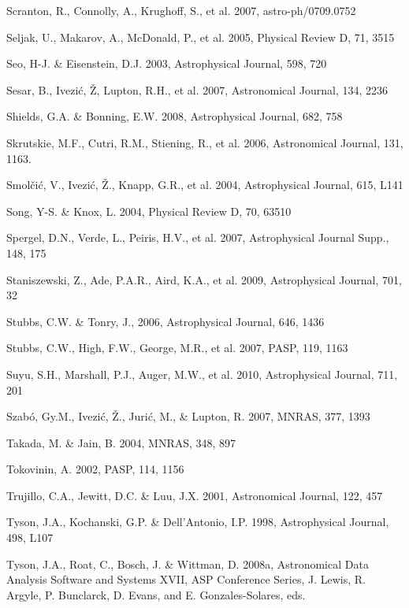 \documentclass{emulateapj}
\begin{document}
\begin{thebibliography}{}
\bibitem[()]{} Scranton, R., Connolly, A., Krughoff, S., et al. 2007, astro-ph/0709.0752

\bibitem[()]{} Seljak, U., Makarov, A., McDonald, P., et al. 2005,  Physical Review D, 71, 3515

\bibitem[()]{} Seo, H-J. \& Eisenstein, D.J. 2003, Astrophysical Journal, 598, 720

\bibitem[()]{} Sesar, B., Ivezi\'{c}, \v{Z}, Lupton, R.H., et al. 2007, Astronomical Journal, 134, 2236

\bibitem[()]{} Shields, G.A. \& Bonning, E.W. 2008,  Astrophysical Journal, 682, 758 

\bibitem[()]{} Skrutskie, M.F., Cutri, R.M., Stiening, R., et al. 2006, Astronomical Journal, 131, 1163.

\bibitem[()]{} Smol{\v c}i{\'c}, V., Ivezi\'{c}, \v{Z.}, Knapp, G.R., et al. 2004, Astrophysical 
             Journal, 615, L141 

\bibitem[()]{} Song, Y-S. \& Knox, L. 2004, Physical Review D, 70, 63510

\bibitem[()]{} Spergel, D.N., Verde, L., Peiris, H.V., et al. 2007, Astrophysical Journal Supp., 148, 175

\bibitem[()]{} Staniszewski, Z., Ade, P.A.R., Aird, K.A., et al. 2009,  Astrophysical  Journal, 701, 32

\bibitem[()]{} Stubbs, C.W. \& Tonry, J., 2006, Astrophysical Journal, 646, 1436

\bibitem[()]{} Stubbs, C.W., High, F.W., George, M.R., et al. 2007, PASP, 119, 1163 

\bibitem[()]{} Suyu, S.H., Marshall, P.J., Auger, M.W., et al. 2010, Astrophysical Journal, 711, 201

\bibitem[()]{} Szab\'o, Gy.M., Ivezi\'c, \v{Z}., Juri\'c, M., \& Lupton, R. 2007, MNRAS, 377, 1393

\bibitem[()]{} Takada, M. \& Jain, B. 2004, MNRAS, 348, 897

\bibitem[()]{} Tokovinin, A. 2002, PASP, 114, 1156

\bibitem[()]{} Trujillo, C.A., Jewitt, D.C. \& Luu, J.X. 2001, Astronomical Journal, 122, 457
	
\bibitem[()]{} Tyson, J.A., Kochanski, G.P. \& Dell'Antonio, I.P. 1998, Astrophysical Journal, 498, L107

\bibitem[()]{} Tyson, J.A., Roat, C., Bosch, J. \& Wittman, D. 2008a, Astronomical 
             Data Analysis Software and Systems XVII, ASP Conference Series, 
             J. Lewis, R. Argyle, P. Bunclarck, D. Evans, and E. Gonzales-Solares, eds.     


\end{thebibliography}
\end{document}
